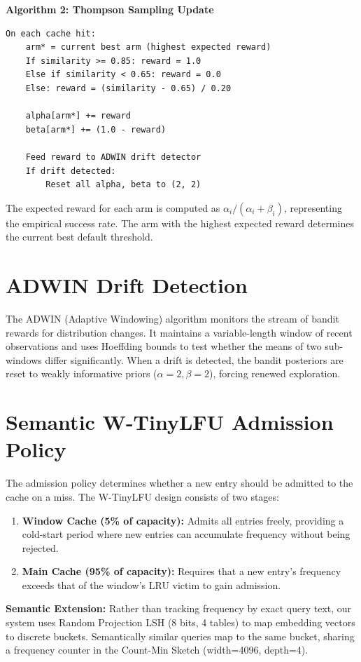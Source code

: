 \documentclass[12pt,a4paper]{report}
\begin{document}
\textbf{Algorithm 2: Thompson Sampling Update}
\begin{lstlisting}
On each cache hit:
    arm* = current best arm (highest expected reward)
    If similarity >= 0.85: reward = 1.0
    Else if similarity < 0.65: reward = 0.0
    Else: reward = (similarity - 0.65) / 0.20

    alpha[arm*] += reward
    beta[arm*] += (1.0 - reward)

    Feed reward to ADWIN drift detector
    If drift detected:
        Reset all alpha, beta to (2, 2)
\end{lstlisting}

The expected reward for each arm is computed as $\alpha_i / (\alpha_i + \beta_i)$, representing the empirical success rate. The arm with the highest expected reward determines the current best default threshold.

\section{ADWIN Drift Detection}

The ADWIN (Adaptive Windowing) algorithm monitors the stream of bandit rewards for distribution changes. It maintains a variable-length window of recent observations and uses Hoeffding bounds to test whether the means of two sub-windows differ significantly. When a drift is detected, the bandit posteriors are reset to weakly informative priors ($\alpha=2, \beta=2$), forcing renewed exploration.

\section{Semantic W-TinyLFU Admission Policy}

The admission policy determines whether a new entry should be admitted to the cache on a miss. The W-TinyLFU design consists of two stages:

\begin{enumerate}[label=(\roman*),leftmargin=2cm]
\item \textbf{Window Cache (5\% of capacity):} Admits all entries freely, providing a cold-start period where new entries can accumulate frequency without being rejected.
\item \textbf{Main Cache (95\% of capacity):} Requires that a new entry's frequency exceeds that of the window's LRU victim to gain admission.
\end{enumerate}

\textbf{Semantic Extension:} Rather than tracking frequency by exact query text, our system uses Random Projection LSH (8 bits, 4 tables) to map embedding vectors to discrete buckets. Semantically similar queries map to the same bucket, sharing a frequency counter in the Count-Min Sketch (width=4096, depth=4).
\end{document}
